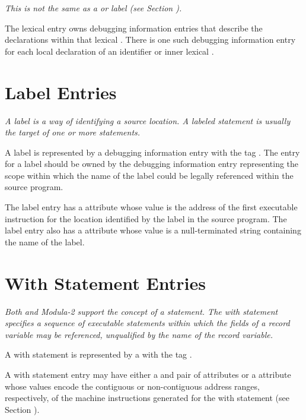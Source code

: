 \textit{This is not the same as a  or 
 label (see Section ).}

The lexical  entry owns debugging 
information entries that describe the declarations 
within that lexical . There is
one such debugging information entry for each local declaration
of an identifier or inner lexical .

\section{Label Entries}
\label{chap:labelentries}
\textit{A label is a way of identifying a source location.
A labeled statement is usually the target of one or more 
 statements.}

A label is represented by a debugging information entry with
the tag \DWTAGlabelTARG. 
The entry for a label should be owned by
the debugging information entry representing the scope within
which the name of the label could be legally referenced within
the source program.

The label entry has a \DWATlowpc{} attribute whose value
is the address of the first executable instruction for the 
location identified by the label in
the source program.  The label entry also has a 
\DWATname{} attribute 
whose value is a null-terminated string containing
the name of the label.   


\section{With Statement Entries}
\label{chap:withstatemententries}

\textit{Both  and 
Modula-2 support the concept of a 
statement. The with statement specifies a sequence of
executable statements within which the fields of a record
variable may be referenced, unqualified by the name of the
record variable.}

A with statement is represented by a
with the tag \DWTAGwithstmtTARG.

A with statement entry may have either a 
\DWATlowpc{} and
\DWAThighpc{} pair of attributes 
or a
\DWATranges{} attribute
whose values encode the contiguous or non-contiguous address
ranges, respectively, of the machine instructions generated
for the with statement 
(see Section ).

